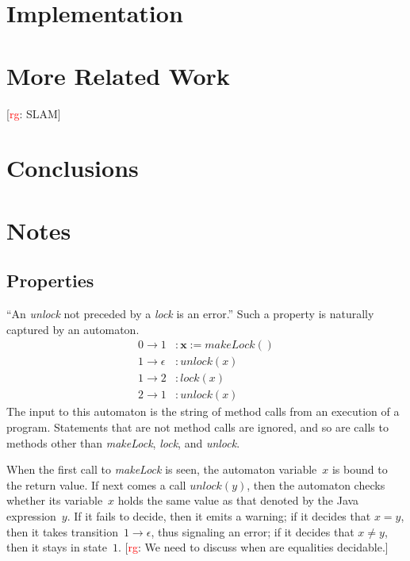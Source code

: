 \documentclass[a4paper]{article}
\newcommand{\todo}[2]{{\small [\textcolor{red}{#1}: #2]}}
\newcommand{\rg}[1]{\todo{rg}{#1}}
\theoremstyle{slanted}
\theoremstyle{definition}
\theoremstyle{remark}
\begin{document}
\section{Implementation}

\section{More Related Work}

\rg{SLAM}
\section{Conclusions}
\section{Notes}

\subsection{Properties}\label{sec:properties} %

``An \textit{unlock} not preceded by a \textit{lock} is an error.''
Such a property is naturally captured by an automaton.
\begin{equation}\label{eq:unlockunlock}
\begin{aligned}
0\to1&: \mathbf{x} := \mathit{makeLock}()\\
1\to\epsilon&: \mathit{unlock}(x)\\
1\to2&: \mathit{lock}(x)\\
2\to1&: \mathit{unlock}(x)
\end{aligned}
\end{equation}
The input to this automaton is the string of method calls from an execution of a program.
Statements that are not method calls are ignored, and so are calls to methods other than \textit{makeLock}, \textit{lock}, and \textit{unlock}.

When the first call to \textit{makeLock} is seen, the automaton variable~$x$ is bound to the return value.
If next comes a call $\mathit{unlock}(y)$, then the automaton checks whether its variable~$x$ holds the same value as that denoted by the Java expression~$y$.
If it fails to decide, then it emits a warning; if it decides that $x=y$, then it takes transition~$1\to\epsilon$, thus signaling an error; if it decides that $x\ne y$, then it stays in state~$1$.
\rg{We need to discuss when are equalities decidable.}
\end{document}
